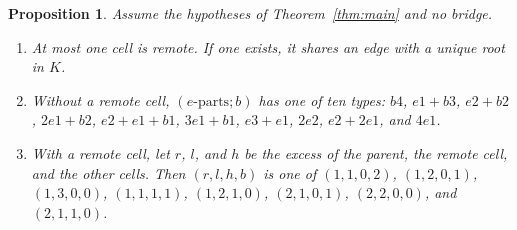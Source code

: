 \documentclass[11pt]{article}
\newtheorem{proposition}{Proposition}
\theoremstyle{remark}
\begin{document}
\begin{proposition}\label{prop:structure}
Assume the hypotheses of Theorem~\ref{thm:main} and no bridge.
\begin{enumerate}
\item At most one cell is remote. If one exists, it shares an edge with a unique root in $K$.
\item Without a remote cell, $(e\text{-parts};b)$ has one of ten types: $b4$, $e1{+}b3$, $e2{+}b2$, $2e1{+}b2$, $e2{+}e1{+}b1$, $3e1{+}b1$, $e3{+}e1$, $2e2$, $e2{+}2e1$, and $4e1$.
\item With a remote cell, let $r$, $l$, and $h$ be the excess of the parent, the remote cell, and the other cells. Then $(r,l,h,b)$ is one of $(1,1,0,2)$, $(1,2,0,1)$, $(1,3,0,0)$, $(1,1,1,1)$, $(1,2,1,0)$, $(2,1,0,1)$, $(2,2,0,0)$, and $(2,1,1,0)$.
\end{enumerate}
\end{proposition}
\end{document}
